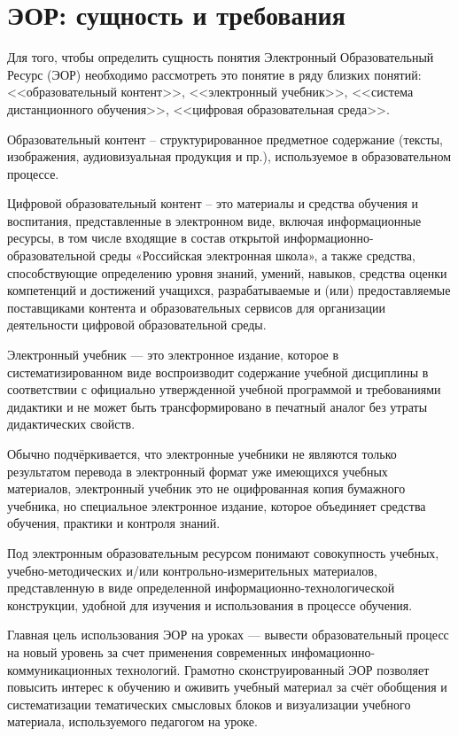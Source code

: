 \newpage
\large
\section {ЭОР: сущность и требования}
\label{section1}
Для того, чтобы определить сущность понятия Электронный Образовательный Ресурс (ЭОР) необходимо рассмотреть это понятие в ряду близких понятий: <<образовательный контент>>, <<электронный учебник>>, <<система дистанционного обучения>>, <<цифровая образовательная среда>>.

Образовательный контент – структурированное предметное содержание (тексты, изображения, аудиовизуальная продукция и пр.), используемое в образовательном процессе. 

Цифровой образовательный контент – это материалы и средства обучения и воспитания, представленные в электронном виде, включая информационные ресурсы, в том числе входящие в состав открытой информационно-образовательной среды «Российская электронная школа», а также средства, способствующие определению уровня знаний, умений, навыков, средства оценки компетенций и достижений учащихся, разрабатываемые и (или) предоставляемые поставщиками контента и образовательных сервисов для организации деятельности цифровой образовательной среды.

Электронный учебник --- это электронное издание, которое в систематизированном виде
воспроизводит содержание учебной дисциплины в соответствии с официально утвержденной учебной программой и требованиями дидактики и не может быть трансформировано в печатный аналог без утраты дидактических свойств\cite{balalaeva}. 

Обычно подчёркивается, что электронные учебники не являются только результатом перевода в электронный формат уже имеющихся учебных материалов, электронный учебник это не оцифрованная копия бумажного учебника, но специальное электронное издание, которое объединяет средства обучения, практики и контроля знаний\cite[c.53]{blinov}.

Под электронным образовательным ресурсом понимают совокупность учебных, учебно-методических и/или контрольно-измерительных материалов, представленную в виде определенной информационно-технологической конструкции, удобной для изучения и использования в процессе обучения\cite{jurkina20}. 

Главная цель использования ЭОР на уроках --- вывести образовательный процесс на новый уровень за счет применения современных инфомационно-коммуникационных технологий. Грамотно сконструированный ЭОР позволяет повысить интерес к обучению и оживить учебный материал за счёт обобщения и систематизации тематических смысловых блоков и визуализации учебного материала, используемого педагогом на уроке.


